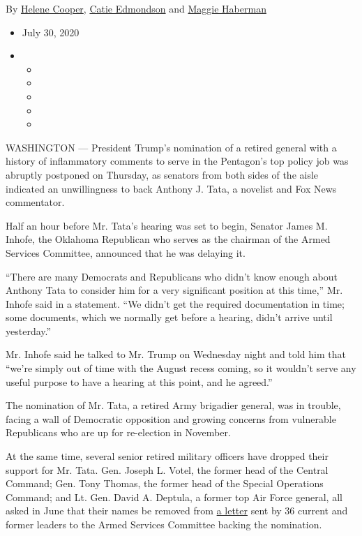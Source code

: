 By \href{https://www.nytimes.com/by/helene-cooper}{Helene Cooper},
\href{https://www.nytimes.com/by/catie-edmondson}{Catie Edmondson} and
\href{https://www.nytimes.com/by/maggie-haberman}{Maggie Haberman}

\begin{itemize}
\item
  July 30, 2020
\item
  \begin{itemize}
  \item
  \item
  \item
  \item
  \item
  \end{itemize}
\end{itemize}

WASHINGTON --- President Trump's nomination of a retired general with a
history of inflammatory comments to serve in the Pentagon's top policy
job was abruptly postponed on Thursday, as senators from both sides of
the aisle indicated an unwillingness to back Anthony J. Tata, a novelist
and Fox News commentator.

Half an hour before Mr. Tata's hearing was set to begin, Senator James
M. Inhofe, the Oklahoma Republican who serves as the chairman of the
Armed Services Committee, announced that he was delaying it.

``There are many Democrats and Republicans who didn't know enough about
Anthony Tata to consider him for a very significant position at this
time,'' Mr. Inhofe said in a statement. ``We didn't get the required
documentation in time; some documents, which we normally get before a
hearing, didn't arrive until yesterday.''

Mr. Inhofe said he talked to Mr. Trump on Wednesday night and told him
that ``we're simply out of time with the August recess coming, so it
wouldn't serve any useful purpose to have a hearing at this point, and
he agreed.''

The nomination of Mr. Tata, a retired Army brigadier general, was in
trouble, facing a wall of Democratic opposition and growing concerns
from vulnerable Republicans who are up for re-election in November.

At the same time, several senior retired military officers have dropped
their support for Mr. Tata. Gen. Joseph L. Votel, the former head of the
Central Command; Gen. Tony Thomas, the former head of the Special
Operations Command; and Lt. Gen. David A. Deptula, a former top Air
Force general, all asked in June that their names be removed from
\href{https://s.wsj.net/public/resources/documents/Tata-Letter_06-18-2020.pdf}{a
letter} sent by 36 current and former leaders to the Armed Services
Committee backing the nomination.

